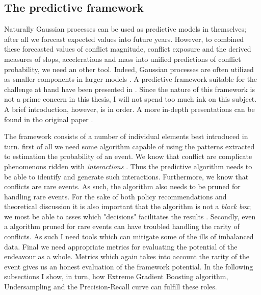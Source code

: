 \documentclass[a4paper]{article}
\begin{document}


\subsection{The predictive framework}


Naturally Gaussian processes can be used as predictive models in themselves; after all we forecast expected values into future years. However, to combined these forecasted values of conflict magnitude, conflict exposure and the derived measures of slops, accelerations and mass into unified predictions of conflict probability, we need an other tool. Indeed, Gaussian processes are often utilized as smaller components in larger models \citep[505]{Gelman_2013}. A predictive framework suitable for the challenge at hand have been presented in \cite{Maase}. Since the nature of this framework is not a prime concern in this thesis, I will not spend too much ink on this subject. A brief introduction, however, is in order. A more in-depth presentations can be found in tho original paper \citep[9-12]{Maase}.\par %
\par

The framework consists of a number of individual elements best introduced in turn. first of all we need some algorithm capable of using the patterns extracted to estimation the probability of an event. We know that conflict are complicate phenomenons ridden with \emph{interactions} \citep[474]{cederman2017predicting}. Thus the predictive algorithm needs to be able to identify and generate such interactions. Furthermore, we know that conflicts are rare events. As such, the algorithm also needs to be pruned for handling rare events. For the sake of both policy recommendations and theoretical discussion it is also important that the algorithm is not a \emph{black box}; we most be able to asses which "decisions" facilitates the results \cite[476]{cederman2017predicting}. Secondly, even a algorithm pruned for rare events can have troubled handling the rarity of conflicts. As such I need tools which can mitigate some of the ills of imbalanced data. Final we need appropriate metrics for evaluating the potential of the endeavour as a whole. Metrics which again takes into account the rarity of the event gives us an honest evaluation of the framework potential. In the following subsections I show, in turn, how Extreme Gradient Boosting algorithm, Undersampling and the Precision-Recall curve can fulfill these roles.\par
\end{document}
